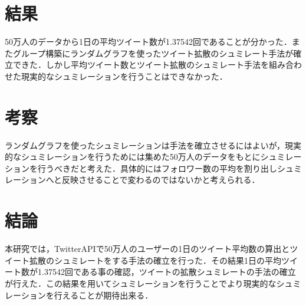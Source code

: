 \documentclass[uplatex,twocolumn,dvipdfmx]{jsarticle}
\begin{document}
\section{結果}

50万人のデータから1日の平均ツイート数が1.37542回であることが分かった．またグループ構築にランダムグラフを使ったツイート拡散のシュミレート手法が確立できた．しかし平均ツイート数とツイート拡散のシュミレート手法を組み合わせた現実的なシュミレーションを行うことはできなかった．


\section{考察}

ランダムグラフを使ったシュミレーションは手法を確立させるにはよいが，現実的なシュミレーションを行うためには集めた50万人のデータをもとにシュミレーションを行うべきだと考えた．具体的にはフォロワー数の平均を割り出しシュミレーションへと反映させることで変わるのではないかと考えられる．

\section{結論}

本研究では，TwitterAPIで50万人のユーザーの1日のツイート平均数の算出とツイート拡散のシュミレートをする手法の確立を行った．その結果1日の平均ツイート数が1.37542回である事の確認，ツイートの拡散シュミレートの手法の確立が行えた．この結果を用いてシュミレーションを行うことでより現実的なシュミレーションを行えることが期待出来る．


\end{document}
